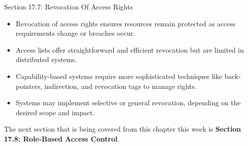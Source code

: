 \begin{notes}{Section 17.7: Revocation Of Access Rights}
    \begin{highlight}
        \begin{itemize}
            \item Revocation of access rights ensures resources remain protected as access requirements change or breaches occur.
            \item Access lists offer straightforward and efficient revocation but are limited in distributed systems.
            \item Capability-based systems require more sophisticated techniques like back-pointers, indirection, and revocation tags to manage rights.
            \item Systems may implement selective or general revocation, depending on the desired scope and impact.
        \end{itemize}
    \end{highlight}
\end{notes}

The next section that is being covered from this chapter this week is \textbf{Section 17.8: Role-Based Access Control}.

